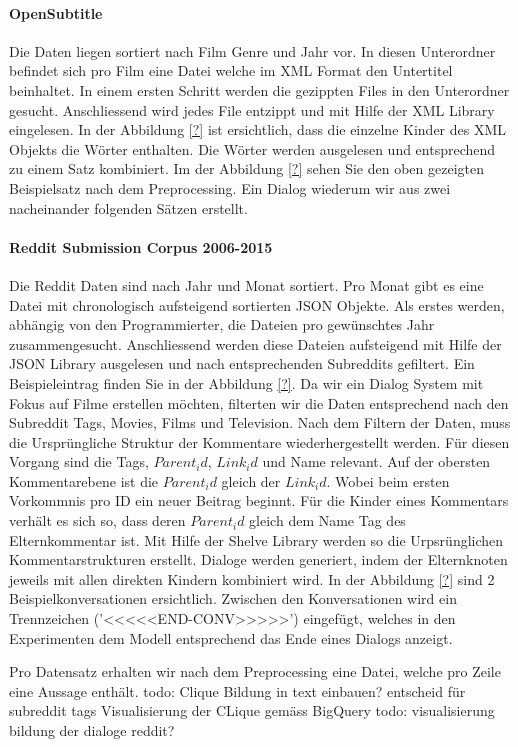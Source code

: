 \paragraph{OpenSubtitle} Die Daten liegen sortiert nach Film Genre und Jahr vor. In diesen Unterordner befindet sich pro Film eine Datei welche im XML Format den Untertitel beinhaltet.
In einem ersten Schritt werden die gezippten Files in den Unterordner gesucht. Anschliessend wird jedes File entzippt und mit Hilfe der XML Library eingelesen. In der Abbildung \ref{?} ist ersichtlich, dass die einzelne Kinder des XML Objekts die Wörter enthalten. Die Wörter werden ausgelesen und entsprechend zu einem Satz kombiniert. Im der Abbildung \ref{?} sehen Sie den oben gezeigten Beispielsatz nach dem Preprocessing. Ein Dialog wiederum wir aus zwei nacheinander folgenden Sätzen erstellt.
\paragraph{Reddit Submission Corpus 2006-2015} Die Reddit Daten sind nach Jahr und Monat sortiert. Pro Monat gibt es eine Datei mit chronologisch aufsteigend sortierten JSON Objekte.
Als erstes werden, abhängig von den Programmierter, die Dateien pro gewünschtes Jahr zusammengesucht. Anschliessend werden diese Dateien aufsteigend mit Hilfe der JSON Library ausgelesen und nach entsprechenden Subreddits gefiltert. Ein Beispieleintrag finden Sie in der Abbildung \ref{?}. Da wir ein Dialog System mit Fokus auf Filme erstellen möchten, filterten wir die Daten entsprechend nach den Subreddit Tags, Movies, Films und Television. Nach dem Filtern der Daten, muss die Ursprüngliche Struktur der Kommentare wiederhergestellt werden. Für diesen Vorgang sind die Tags, $Parent_id$, $Link_id$ und Name relevant. Auf der obersten Kommentarebene ist die $Parent_id$ gleich der $Link_id$. Wobei beim ersten Vorkommnis pro ID ein neuer Beitrag beginnt. Für die Kinder eines Kommentars verhält es sich so, dass deren $Parent_id$ gleich dem Name Tag des Elternkommentar ist. Mit Hilfe der Shelve Library werden so die Urpsrünglichen Kommentarstrukturen erstellt. Dialoge werden generiert, indem der Elternknoten jeweils mit allen direkten Kindern kombiniert wird. In der Abbildung \ref{?} sind 2 Beispielkonversationen ersichtlich. Zwischen den Konversationen wird ein Trennzeichen ('<<<<<END-CONV>>>>>') eingefügt, welches in den Experimenten dem Modell entsprechend das Ende eines Dialogs anzeigt.

Pro Datensatz erhalten wir nach dem Preprocessing eine Datei, welche pro Zeile eine Aussage enthält.
todo: Clique Bildung in text einbauen? entscheid für subreddit tags Visualisierung der CLique gemäss BigQuery
todo: visualisierung bildung der dialoge reddit?
